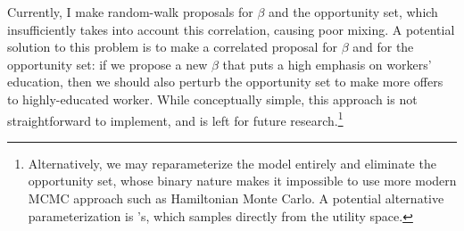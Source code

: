 Currently, I make random-walk proposals for $\beta$ and the opportunity set,
which insufficiently takes into account this correlation, causing poor mixing. A
potential solution to this problem is to make a correlated proposal for $\beta$
and for the opportunity set: if we propose a new $\beta$ that
puts a high emphasis on workers' education, then we should also perturb the
opportunity set to make more offers to highly-educated worker. While
conceptually simple, this approach is not straightforward to implement, and is
left for future research.\footnote{Alternatively, we may reparameterize the
  model entirely and eliminate the opportunity set, whose binary nature makes it
impossible to use more modern MCMC approach such as Hamiltonian Monte Carlo. A
potential alternative parameterization is \citet{Logan2008}'s, which samples
directly from the utility space.}

